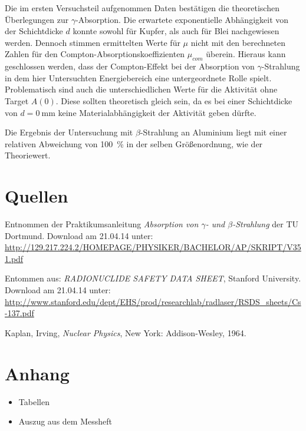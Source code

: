 \documentclass[11pt,ngerman,a4paper]{article}
\begin{document}
Die im ersten Versuchsteil aufgenommen Daten bestätigen die theoretischen Überlegungen zur $\gamma$-Absorption. Die erwartete exponentielle Abhängigkeit von der Schichtdicke $d$ konnte sowohl für Kupfer, als auch für Blei nachgewiesen werden. Dennoch stimmen ermittelten Werte für $\mu$ nicht mit den berechneten Zahlen für den Compton-Absorptionskoeffizienten $\mu_{com}$ überein. Hieraus kann geschlossen werden, dass der Compton-Effekt bei der Absorption von $\gamma$-Strahlung in dem hier Untersuchten Energiebereich eine untergeordnete Rolle spielt. Problematisch sind auch die unterschiedlichen Werte für die Aktivität ohne Target $A(0)$. Diese sollten theoretisch gleich sein, da es bei einer Schichtdicke von $d = \SI{0}{\milli\meter}$ keine Materialabhängigkeit der Aktivität geben dürfte.

\noindent
Die Ergebnis der Untersuchung mit $\beta$-Strahlung an Aluminium liegt mit einer relativen Abweichung von \SI{100}{\percent} in der selben Größenordnung, wie der Theoriewert.

\noindent
\newpage
\section{Quellen}
\begin{enumerate}[{[}1{]}]
\item Entnommen der Praktikumsanleitung \textit{Absorption von $\gamma$- und $\beta$-Strahlung} der TU Dortmund. Download am 21.04.14 unter:\\
 \url{http://129.217.224.2/HOMEPAGE/PHYSIKER/BACHELOR/AP/SKRIPT/V351.pdf}
 \item Entommen aus: \textit{RADIONUCLIDE SAFETY DATA SHEET}, Stanford University.\\ Download am 21.04.14 unter:\\
\url{http://www.stanford.edu/dept/EHS/prod/researchlab/radlaser/RSDS_sheets/Cs-137.pdf}
 \item Kaplan, Irving, \textit{Nuclear Physics}, New York: Addison-Wesley, 1964.
\end{enumerate}
\section{Anhang}
\begin{itemize}
\item Tabellen
\item Auszug aus dem Messheft
\end{itemize}
\newpage
\end{document}
